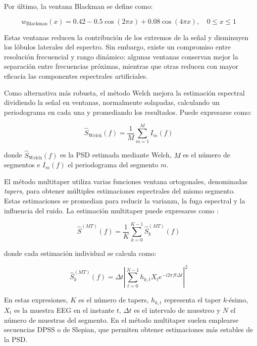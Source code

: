 \documentclass[../main.tex]{subfiles}
\begin{document}
Por último, la ventana Blackman se define como:

\begin{equation}
    w_{\text{Blackman}}(x)
    =
    0.42
    -
    0.5\cos(2\pi x)
    +
    0.08\cos(4\pi x),
    \quad 0 \leq x \leq 1
    \label{eq:blackman}
\end{equation}

Estas ventanas reducen la contribución de los extremos de la señal y disminuyen los lóbulos laterales del espectro. Sin embargo, existe un compromiso entre resolución frecuencial y rango dinámico: algunas ventanas conservan mejor la separación entre frecuencias próximas, mientras que otras reducen con mayor eficacia las componentes espectrales artificiales.

Como alternativa más robusta, el método Welch mejora la estimación espectral dividiendo la señal en ventanas, normalmente solapadas, calculando un periodograma en cada una y promediando los resultados. Puede expresarse como:

\begin{equation}
    \hat{S}_{\text{Welch}}(f)
    =
    \frac{1}{M}
    \sum_{m=1}^{M}
    I_m(f)
    \label{eq:welch}
\end{equation}

donde \(\hat{S}_{\text{Welch}}(f)\) es la PSD estimada mediante Welch, \(M\) es el número de segmentos e \(I_m(f)\) el periodograma del segmento \(m\).

El método multitaper utiliza varias funciones ventana ortogonales, denominadas \textit{tapers}, para obtener múltiples estimaciones espectrales del mismo segmento. Estas estimaciones se promedian para reducir la varianza, la fuga espectral y la influencia del ruido. La estimación multitaper puede expresarse como \cite{Sawa2022}:

\begin{equation}
    \hat{S}^{(MT)}(f)
    =
    \frac{1}{K}
    \sum_{k=0}^{K-1}
    \hat{S}^{(MT)}_k(f)
    \label{eq:multitaper}
\end{equation}

donde cada estimación individual se calcula como:

\begin{equation}
    \hat{S}^{(MT)}_k(f)
    =
    \Delta t
    \left|
    \sum_{t=0}^{N-1}
    h_{k,t} X_t
    e^{-i2\pi f t \Delta t}
    \right|^2
    \label{eq:multitaper_individual}
\end{equation}

En estas expresiones, \(K\) es el número de tapers, \(h_{k,t}\) representa el taper \(k\)-ésimo, \(X_t\) es la muestra EEG en el instante \(t\), \(\Delta t\) es el intervalo de muestreo y \(N\) el número de muestras del segmento. En el método multitaper suelen emplearse secuencias DPSS o de Slepian, que permiten obtener estimaciones más estables de la PSD.
\end{document}
